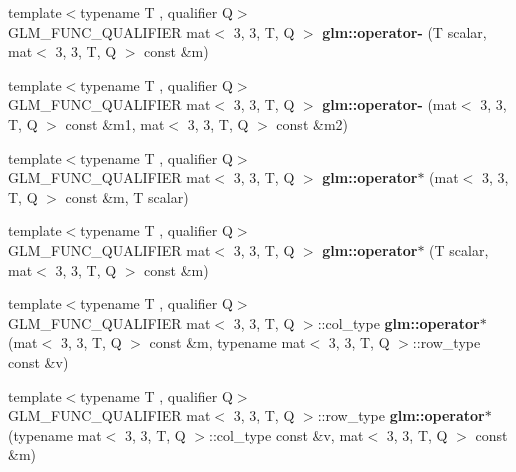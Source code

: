 \begin{DoxyCompactItemize}
\item 
\mbox{\label{type__mat3x3_8inl_a2e99f96948f8081c4406fecc8f249c90}} 
{\footnotesize template$<$typename T , qualifier Q$>$ }\\G\+L\+M\+\_\+\+F\+U\+N\+C\+\_\+\+Q\+U\+A\+L\+I\+F\+I\+ER mat$<$ 3, 3, T, Q $>$ {\bfseries glm\+::operator-\/} (T scalar, mat$<$ 3, 3, T, Q $>$ const \&m)
\item 
\mbox{\label{type__mat3x3_8inl_af224ea664ab27543f4689b64ea9992f3}} 
{\footnotesize template$<$typename T , qualifier Q$>$ }\\G\+L\+M\+\_\+\+F\+U\+N\+C\+\_\+\+Q\+U\+A\+L\+I\+F\+I\+ER mat$<$ 3, 3, T, Q $>$ {\bfseries glm\+::operator-\/} (mat$<$ 3, 3, T, Q $>$ const \&m1, mat$<$ 3, 3, T, Q $>$ const \&m2)
\item 
\mbox{\label{type__mat3x3_8inl_a65d446761e063f5405800ae6830f3720}} 
{\footnotesize template$<$typename T , qualifier Q$>$ }\\G\+L\+M\+\_\+\+F\+U\+N\+C\+\_\+\+Q\+U\+A\+L\+I\+F\+I\+ER mat$<$ 3, 3, T, Q $>$ {\bfseries glm\+::operator$\ast$} (mat$<$ 3, 3, T, Q $>$ const \&m, T scalar)
\item 
\mbox{\label{type__mat3x3_8inl_a13dbd4ae75ddb6a322a55b40a684cf22}} 
{\footnotesize template$<$typename T , qualifier Q$>$ }\\G\+L\+M\+\_\+\+F\+U\+N\+C\+\_\+\+Q\+U\+A\+L\+I\+F\+I\+ER mat$<$ 3, 3, T, Q $>$ {\bfseries glm\+::operator$\ast$} (T scalar, mat$<$ 3, 3, T, Q $>$ const \&m)
\item 
\mbox{\label{type__mat3x3_8inl_a462fe592c2e973a2c263e10376da9d98}} 
{\footnotesize template$<$typename T , qualifier Q$>$ }\\G\+L\+M\+\_\+\+F\+U\+N\+C\+\_\+\+Q\+U\+A\+L\+I\+F\+I\+ER mat$<$ 3, 3, T, Q $>$\+::col\+\_\+type {\bfseries glm\+::operator$\ast$} (mat$<$ 3, 3, T, Q $>$ const \&m, typename mat$<$ 3, 3, T, Q $>$\+::row\+\_\+type const \&v)
\item 
\mbox{\label{type__mat3x3_8inl_a4c4ed3ab1c20ac7cf1622296aa51e82f}} 
{\footnotesize template$<$typename T , qualifier Q$>$ }\\G\+L\+M\+\_\+\+F\+U\+N\+C\+\_\+\+Q\+U\+A\+L\+I\+F\+I\+ER mat$<$ 3, 3, T, Q $>$\+::row\+\_\+type {\bfseries glm\+::operator$\ast$} (typename mat$<$ 3, 3, T, Q $>$\+::col\+\_\+type const \&v, mat$<$ 3, 3, T, Q $>$ const \&m)

\end{DoxyCompactItemize}
